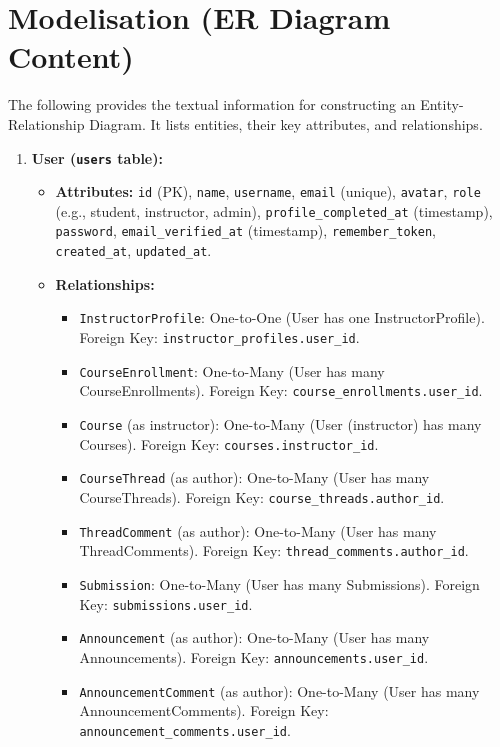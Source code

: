 \section*{Modelisation (ER Diagram Content)}

The following provides the textual information for constructing an Entity-Relationship Diagram. It lists entities, their key attributes, and relationships.

\begin{enumerate}
    \item \textbf{User (\texttt{users} table):}
    \begin{itemize}
        \item \textbf{Attributes:} \texttt{id} (PK), \texttt{name}, \texttt{username}, \texttt{email} (unique), \texttt{avatar}, \texttt{role} (e.g., student, instructor, admin), \texttt{profile\_completed\_at} (timestamp), \texttt{password}, \texttt{email\_verified\_at} (timestamp), \texttt{remember\_token}, \texttt{created\_at}, \texttt{updated\_at}.
        \item \textbf{Relationships:}
        \begin{itemize}
            \item \texttt{InstructorProfile}: One-to-One (User has one InstructorProfile). Foreign Key: \texttt{instructor\_profiles.user\_id}.
            \item \texttt{CourseEnrollment}: One-to-Many (User has many CourseEnrollments). Foreign Key: \texttt{course\_enrollments.user\_id}.
            \item \texttt{Course} (as instructor): One-to-Many (User (instructor) has many Courses). Foreign Key: \texttt{courses.instructor\_id}.
            \item \texttt{CourseThread} (as author): One-to-Many (User has many CourseThreads). Foreign Key: \texttt{course\_threads.author\_id}.
            \item \texttt{ThreadComment} (as author): One-to-Many (User has many ThreadComments). Foreign Key: \texttt{thread\_comments.author\_id}.
            \item \texttt{Submission}: One-to-Many (User has many Submissions). Foreign Key: \texttt{submissions.user\_id}.
            \item \texttt{Announcement} (as author): One-to-Many (User has many Announcements). Foreign Key: \texttt{announcements.user\_id}.
            \item \texttt{AnnouncementComment} (as author): One-to-Many (User has many AnnouncementComments). Foreign Key: \texttt{announcement\_comments.user\_id}.

\end{itemize}
\end{itemize}
\end{enumerate}
